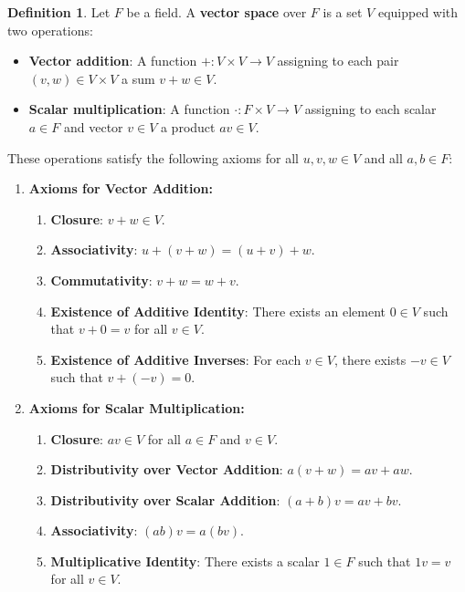 \documentclass{article}
\theoremstyle{definition}
\newtheorem{definition}{Definition}[section]
\theoremstyle{remark}
\begin{document}
\begin{definition}
Let \( F \) be a field. A \textbf{vector space} over \( F \) is a set \( V \) equipped with two operations:
\begin{itemize}
\item \textbf{Vector addition}: A function \( +: V \times V \to V \) assigning to each pair \( (v, w) \in V \times V \) a sum \( v + w \in V \).
\item \textbf{Scalar multiplication}: A function \( \cdot: F \times V \to V \) assigning to each scalar \( a \in F \) and vector \( v \in V \) a product \( av \in V \).
\end{itemize}
These operations satisfy the following axioms for all \( u, v, w \in V \) and all \( a, b \in F \):

\begin{enumerate}
\item \textbf{Axioms for Vector Addition:}
\begin{enumerate}
\item \textbf{Closure}: \( v + w \in V \).
\item \textbf{Associativity}: \( u + (v + w) = (u + v) + w \).
\item \textbf{Commutativity}: \( v + w = w + v \).
\item \textbf{Existence of Additive Identity}: There exists an element \( 0 \in V \) such that \( v + 0 = v \) for all \( v \in V \).
\item \textbf{Existence of Additive Inverses}: For each \( v \in V \), there exists \( -v \in V \) such that \( v + (-v) = 0 \).
\end{enumerate}

\item \textbf{Axioms for Scalar Multiplication:}
\begin{enumerate}
\item \textbf{Closure}: \( av \in V \) for all \( a \in F \) and \( v \in V \).
\item \textbf{Distributivity over Vector Addition}: \( a(v + w) = av + aw \).
\item \textbf{Distributivity over Scalar Addition}: \( (a + b)v = av + bv \).
\item \textbf{Associativity}: \( (ab)v = a(bv) \).
\item \textbf{Multiplicative Identity}: There exists a scalar \( 1 \in F \) such that \( 1v = v \) for all \( v \in V \).
\end{enumerate}
\end{enumerate}

\end{definition}
\end{document}

